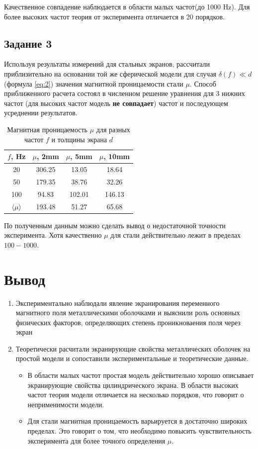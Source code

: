 \documentclass[a4paper,12pt]{article}
\begin{document}
Качественное совпадение наблюдается в области малых частот(до 1000 Hz). Для более высоких частот теория от эксперимента отличается в 20 порядков.
\subsection{Задание 3}
Используя результаты измерений для стальных экранов, рассчитали приблизительно на основании той же сферической модели для случая $\delta (f) \ll d$ (формула \eqref{eq:2}) значения магнитной проницаемости стали $\mu$. Способ приближенного расчета состоял в численном решение уравнения для 3 нижних частот (для высоких частот модель \textbf{не совпадает}) частот и последующем усреднении результатов.
\begin{table}[htbp]
  \centering
  \caption{Магнитная проницаемость $\mu$ для разных частот $f$ и толщины экрана $d$}
    \begin{tabular}{|c|c|c|c|}
    \toprule
    $f$, Hz & $\mu$, 2mm & $\mu$, 5mm & $\mu$, 10mm \\
    \midrule
    20 & 306.25 & 13.05 & 18.64 \\
    \midrule
    50 & 179.35 & 38.76 & 32.26 \\
    \midrule
    100 & 94.83 & 102.01 & 146.13 \\
    \midrule
    $\langle \mu \rangle$ & 193.48 & 51.27 & 65.68 \\
    \bottomrule
    \end{tabular}%
\end{table}%
По полученным данным можно сделать вывод о недостаточной точности эксперимента. Хотя качественно $\mu$ для стали действительно лежит в пределах $100-1000$.
\section{Вывод}
\begin{enumerate}
	\item Экспериментально наблюдали явление экранирования переменного магнитного поля металлическими оболочками и выяснили роль основных физических факторов, определяющих степень проникноваения поля через экран
	\item Теоретически расчитали экранирующие свойства металлических оболочек на простой модели и сопоставили экспериментальные и теоретические данные.
	\begin{itemize}
		\item В области малых частот простая модель действительно хорошо описывает экранирующие свойства цилиндрического экрана. В области высоких частот теория модели отличается на несколько порядков, что говорит о неприменимости модели.
		\item Для стали магнитная проницаемость варьируется в достаточно широких пределах. Это говорит о том, что необходимо повысить чувствительность эксперимента для более точного определения $\mu$.
	\end{itemize}
\end{enumerate}
\end{document}

